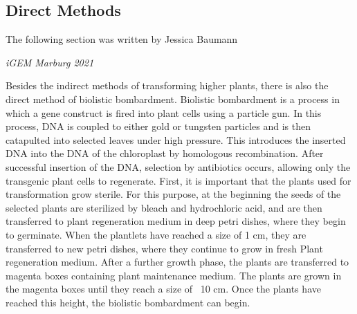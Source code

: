 \subsection{Direct Methods}
\epigraph{The following section was written by Jessica Baumann}{\textit{iGEM 
Marburg 2021}}
\noindent
Besides the indirect methods of transforming higher plants, there is also the direct method of biolistic bombardment. Biolistic bombardment is a process in which a gene construct is fired into plant cells using a particle gun. In this process, DNA is coupled to either gold or tungsten particles and is then catapulted into selected leaves under high pressure. 
This introduces the inserted DNA into the DNA of the chloroplast by homologous recombination. After successful insertion of the DNA, selection by antibiotics occurs, allowing only the transgenic plant cells to regenerate. First, it is important that the plants used for transformation grow sterile. For this purpose, at the beginning the seeds of the selected plants are sterilized by bleach and hydrochloric acid, and are then transferred to plant regeneration medium in deep petri dishes, where they begin to germinate. When the plantlets have reached a size of 1 cm, they are transferred to new petri dishes, where they continue to grow in fresh Plant regeneration medium. After a further growth phase, the plants are transferred to magenta boxes containing plant maintenance medium. The plants are grown in the magenta boxes until they reach a size of ~10 cm. Once the plants have reached this height, the biolistic bombardment can begin. 
\\ \\
